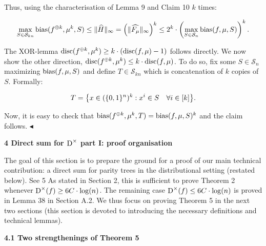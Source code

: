 \documentclass[10pt,a4paper]{article}
\begin{document}
Thus, using the characterisation of Lemma 9 and Claim 10 $k$ times:\par


\[\begin{gathered}
\max_{S\in\mathcal{S}_{kn}}{\textup{bias}}(f^{\oplus k},\mu^{k},S)\leq\|\widehat{H}\|_{\infty}=\left(\|\widehat{F_{\mu}}\|_{\infty}\right)^{k}\leq 2^{k}\cdot\left(\max_{S\in\mathcal{S}_{n}}{\textup{bias}}(f,\mu,S)\right)^{k}.
\end{gathered}\]


The XOR-lemma ${\textup{disc}}(f^{\oplus k},\mu^{k})\geq k\cdot({\textup{disc}}(f,\mu)-1)$ follows directly. We now show the other direction, ${\textup{disc}}(f^{\oplus k},\mu^{k})\leq k\cdot{\textup{disc}}(f,\mu)$. To do so, fix some $S\in\mathcal{S}_{n}$ maximizing ${\textup{bias}}(f,\mu,S)$ and define $T\in\mathcal{S}_{kn}$ which is concatenation of $k$ copies of $S$. Formally:\par


\[\begin{gathered}
T=\big{\{}x\in(\{0,1\}^{n})^{k}:x^{i}\in S\quad\forall i\in[k]\big{\}}.
\end{gathered}\]


Now, it is easy to check that ${\textup{bias}}(f^{\oplus k},\mu^{k},T)={\textup{bias}}(f,\mu,S)^{k}$ and the claim follows.
$\blacktriangleleft$\par







\par\medskip\noindent\textbf{
4 Direct sum for ${\textup{D}}^{\times}$ part I: proof organisation}\par




The goal of this section is to prepare the ground for a proof of our main technical contribution: a direct sum for parity trees in the distributional setting (restated below).
See 5
As stated in Section 2, this is sufficient to prove Theorem 2 whenever ${\textup{D}}^{\times}(f)\geq 6C\cdot\log(n)$. The remaining case ${\textup{D}}^{\times}(f)\leq 6C\cdot\log(n)$ is proved in Lemma 38 in Section A.2. We thus focus on proving Theorem 5 in the next two sections (this section is devoted to introducing the necessary definitions and technical lemmas).\par




\par\medskip\noindent\textbf{
4.1 Two strengthenings of Theorem 5
}\par
\end{document}

